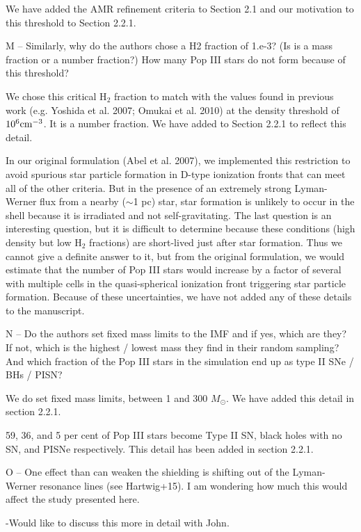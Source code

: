 \documentclass[11pt]{article}
\newenvironment{referee}[1][]{%
    \ignorespaces%
    \begin{mdframed}[style=myquotestyle,#1]%
}{%
    \end{mdframed}%
    \ignorespacesafterend%
}%
\begin{document}
We have added the AMR refinement criteria to Section 2.1 and our motivation to this threshold to Section 2.2.1.

\begin{referee}
M -- Similarly, why do the authors chose a H2 fraction of 1.e-3? (Is is a mass fraction or a number fraction?) How many Pop III stars do not form because of this threshold?
\end{referee}

We chose this critical H$_2$ fraction to match with the values found in previous work (e.g. Yoshida et al. 2007; Omukai et al. 2010) at the density threshold of $10^6 \cubecm$.  It is a number fraction.  We have added to Section 2.2.1 to reflect this detail.

In our original formulation (Abel et al. 2007), we implemented this restriction to avoid spurious star particle formation in D-type ionization fronts that can meet all of the other criteria.  But in the presence of an extremely strong Lyman-Werner flux from a nearby ($\sim$1 pc) star, star formation is unlikely to occur in the shell because it is irradiated and not self-gravitating. The last question is an interesting question, but it is difficult to determine because these conditions (high density but low H$_2$ fractions) are short-lived just after star formation.  Thus we cannot give a definite answer to it, but from the original formulation, we would estimate that the number of Pop III stars would increase by a factor of several with multiple cells in the quasi-spherical ionization front triggering star particle formation.  Because of these uncertainties, we have not added any of these details to the manuscript.

\begin{referee}
N -- Do the authors set fixed mass limits to the IMF and if yes, which are they?  If not, which is the highest / lowest mass they find in their random sampling?  And which fraction of the Pop III stars in the simulation end up as type II SNe / BHs / PISN?
\end{referee}
We do set fixed mass limits, between 1 and 300 $M_{\odot}$. We have added this detail in section 2.2.1.  

59, 36, and 5 per cent of Pop III stars become Type II SN, black holes with no SN, and PISNe respectively. This detail has been added in section 2.2.1.

\begin{referee}
O -- One effect than can weaken the shielding is shifting out of the Lyman-Werner resonance lines (see Hartwig+15). I am wondering how much this would affect the study presented here.
\end{referee}
-Would like to discuss this more in detail with John.
\end{document}
